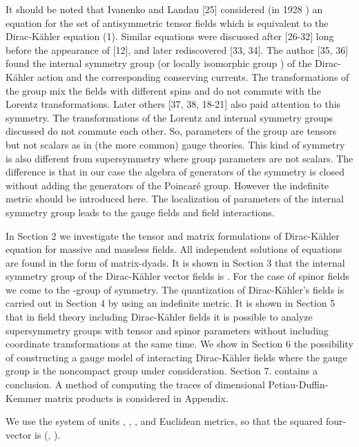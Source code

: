 \documentclass[a4paper,12pt]{article}
\begin{document}
It should be noted that Ivanenko and Landau [25] considered (in 1928 ) an
equation for the set of antisymmetric tensor fields which is equivalent to
the Dirac-K\"ahler equation (1). Similar equations were discussed after
[26-32] long before the appearance of [12], and later rediscovered [33, 34].
The author [35, 36] found the internal symmetry group \coordHE{} (or locally
isomorphic group \coordHE{}) of the Dirac-K\"ahler action and the
corresponding conserving currents. The transformations of the \coordHE{}
group mix the fields with different spins and do not commute with the
Lorentz transformations. Later others [37, 38, 18-21] also paid attention to
this symmetry. The transformations of the Lorentz and internal symmetry
groups discussed do not commute each other. So, parameters of the group are
tensors but not scalars as in (the more common) gauge theories. This kind of
symmetry is also different from supersymmetry where group parameters are not
scalars. The difference is that in our case the algebra of generators of the
symmetry is closed without adding the generators of the Poincar\'e group.
However the indefinite metric should be introduced here. The localization of
parameters of the internal symmetry group leads to the gauge fields and
field interactions.

In Section 2 we investigate the tensor and matrix formulations of
Dirac-K\"ahler equation for massive and massless fields. All
independent solutions of equations are found in the form of
matrix-dyads. It is shown in Section 3 that the internal symmetry
group of the Dirac-K\"ahler vector fields is \coordHE{}. For the
case of spinor fields we come to the \coordHE{} -group of symmetry.
The quantization of Dirac-K\"ahler's fields is carried out in
Section 4 by using an indefinite metric. It is shown in Section 5
that in field theory including Dirac-K\"ahler fields it is
possible to analyze supersymmetry groups with tensor and spinor
parameters without including coordinate transformations at the
same time. We show in Section 6 the possibility of constructing a
gauge model of interacting Dirac-K\"ahler fields where the gauge
group is the noncompact group \coordHE{} under consideration.
Section 7. contains a conclusion. A method of computing the traces
of \coordHE{}dimensional Petiau-Duffin-Kemmer matrix products is
considered in Appendix.

We use the system of units \coordHE{}, \coordHE{}, \coordHE{}, and Euclidean metrics, so that the squared
four-vector is \coordHE{}
(\coordHE{}, \coordHE{}).
\end{document}
